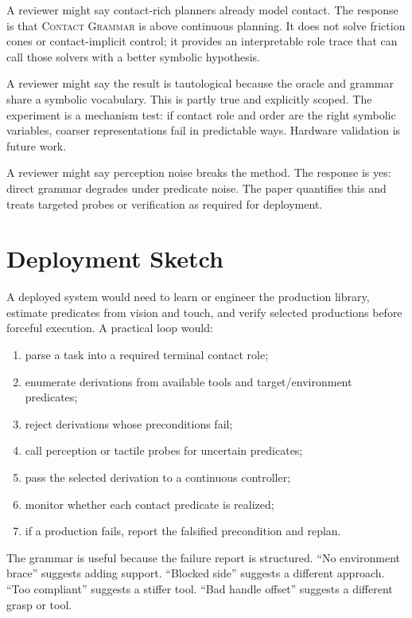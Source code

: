 \documentclass{article}
\newcommand{\CG}{\textsc{Contact Grammar}}
\begin{document}
A reviewer might say contact-rich planners already model contact. The response is that \CG{} is above continuous planning. It does not solve friction cones or contact-implicit control; it provides an interpretable role trace that can call those solvers with a better symbolic hypothesis.

A reviewer might say the result is tautological because the oracle and grammar share a symbolic vocabulary. This is partly true and explicitly scoped. The experiment is a mechanism test: if contact role and order are the right symbolic variables, coarser representations fail in predictable ways. Hardware validation is future work.

A reviewer might say perception noise breaks the method. The response is yes: direct grammar degrades under predicate noise. The paper quantifies this and treats targeted probes or verification as required for deployment.

\section{Deployment Sketch}

A deployed system would need to learn or engineer the production library, estimate predicates from vision and touch, and verify selected productions before forceful execution. A practical loop would:
\begin{enumerate}
    \item parse a task into a required terminal contact role;
    \item enumerate derivations from available tools and target/environment predicates;
    \item reject derivations whose preconditions fail;
    \item call perception or tactile probes for uncertain predicates;
    \item pass the selected derivation to a continuous controller;
    \item monitor whether each contact predicate is realized;
    \item if a production fails, report the falsified precondition and replan.
\end{enumerate}

The grammar is useful because the failure report is structured. ``No environment brace'' suggests adding support. ``Blocked side'' suggests a different approach. ``Too compliant'' suggests a stiffer tool. ``Bad handle offset'' suggests a different grasp or tool.
\end{document}
